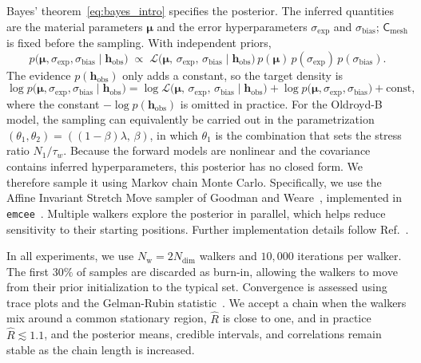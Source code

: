 \documentclass{elsarticle}
\renewcommand{\vec}[1]{\boldsymbol{#1}}
\newcommand{\mat}[1]{\mathsf{#1}}
\newcommand{\params}{\boldsymbol{\mu}}
\newcommand{\subexp}{\mathrm{exp}}
\newcommand{\subbias}{\mathrm{bias}}
\newcommand{\submesh}{\mathrm{mesh}}        %
\newcommand{\obs}{\mathrm{obs}}
\begin{document}
Bayes' theorem~\eqref{eq:bayes_intro} specifies the posterior. The inferred
quantities are the material parameters $\params$ and the error hyperparameters
$\sigma_{\subexp}$ and $\sigma_{\subbias}$; $\mat{C}_{\submesh}$ is fixed
before the sampling. With independent priors,
\begin{equation}
p\bigl({\params},\sigma_{\subexp},\sigma_{\subbias}
      \mid \vec{h}_{\obs}\bigr)
\;\propto\;
\mathcal{L}\bigl({\params},\,\sigma_{\subexp},\,\sigma_{\subbias}
\mid \vec{h}_{\obs}\bigr)\,
p(\params)\,p(\sigma_{\subexp})\,p(\sigma_{\subbias}).
\label{eq:posterior_full}
\end{equation}
The evidence $p(\vec{h}_{\obs})$ only adds a constant, so the target
density is
\begin{equation}
\log p\bigl({\params},\sigma_{\subexp},\sigma_{\subbias}
      \mid \vec{h}_{\obs}\bigr)
= \log \mathcal{L}\bigl({\params},\,\sigma_{\subexp},\,\sigma_{\subbias}
\mid \vec{h}_{\obs}\bigr)
+ \log p\bigl({\params},\sigma_{\subexp},\sigma_{\subbias}\bigr)
+ \mathrm{const},
\label{eq:log_posterior}
\end{equation}
where the constant $-\log p(\vec{h}_{\obs})$ is omitted in practice. For the
Oldroyd-B model, the sampling can equivalently be carried out in the
parametrization $(\theta_1,\theta_2) = ((1-\beta)\lambda,\,\beta)$, in which
$\theta_1$ is the combination that sets the stress ratio $N_1/\tau_w$. Because
the forward models are nonlinear and the covariance contains inferred
hyperparameters, this posterior has no closed form. We therefore sample it
using Markov chain Monte Carlo. Specifically, we use the Affine Invariant
Stretch Move sampler of Goodman and Weare~\cite{goodman2010ensemble},
implemented in \texttt{emcee}~\cite{foremanmackey2013emcee}. Multiple walkers
explore the posterior in parallel, which helps reduce sensitivity to their
starting positions. Further implementation details follow
Ref.~\cite{rinkens2023uncertainty}.

In all experiments, we use $N_{\mathrm{w}}=2N_{\mathrm{dim}}$ walkers and
$10{,}000$ iterations per walker. The first $30\%$ of samples are discarded as
burn-in, allowing the walkers to move from their prior initialization to the
typical set. Convergence is assessed using trace plots and the Gelman-Rubin
statistic~\cite{gelman1992rubin,brooks1998convergence}. We accept a chain when
the walkers mix around a common stationary region, $\hat{R}$ is close to one,
and in practice $\hat{R}\lesssim1.1$, and the posterior means, credible
intervals, and correlations remain stable as the chain length is increased.
\end{document}
